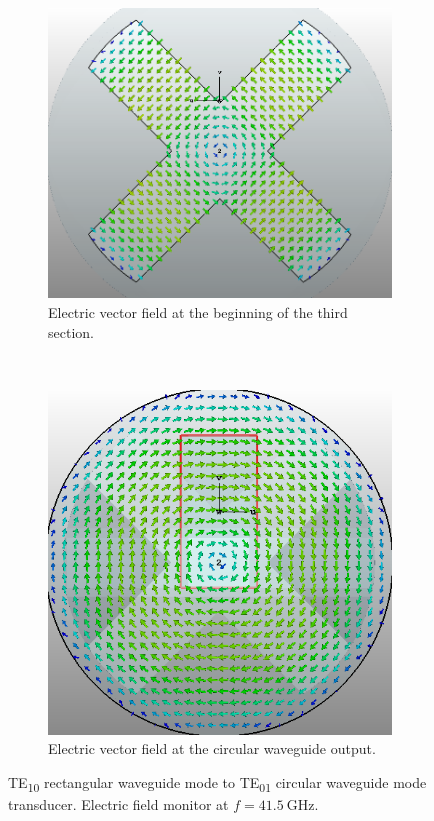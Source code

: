 \documentclass[english,twoside]{article}
\begin{document}
\begin{landscape}
\begin{figure}
			\begin{subfigure}[b]{.45\textwidth}
				\includegraphics[width=\textwidth]{figures/marie_s4}
				\caption{Electric vector field at the beginning of the third section.}
			\end{subfigure}
			~
			\begin{subfigure}[b]{.45\textwidth}
				\includegraphics[width=\textwidth]{figures/marie_output}
				\caption{Electric vector field at the circular waveguide output.}
			\end{subfigure}
			\caption{TE\textsubscript{10} rectangular waveguide mode to TE\textsubscript{01} circular waveguide mode transducer. Electric field monitor at $f=\SI{41.5}{\giga\hertz}$.}
		\end{figure}
	\end{landscape}
    
\end{document}

